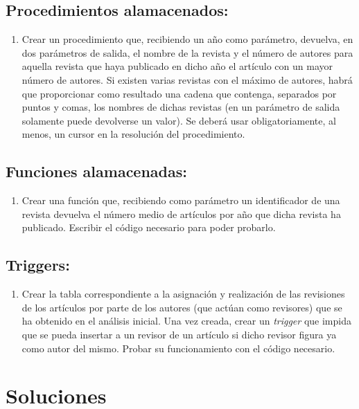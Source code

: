 \documentclass{db-practice}
\begin{document}
\subsection*{Procedimientos alamacenados:}

\begin{enumerate}
    \item Crear un procedimiento que, recibiendo un año como parámetro, devuelva, en dos parámetros de salida, el nombre de la revista y el número de autores para aquella revista que haya publicado en dicho año el artículo con un mayor número de autores. Si existen varias revistas con el máximo de autores, habrá que proporcionar como resultado una cadena que contenga, separados por puntos y comas, los nombres de dichas revistas (en un parámetro de salida solamente puede devolverse un valor). Se deberá usar obligatoriamente, al menos, un cursor en la resolución del procedimiento.
\end{enumerate}

\subsection*{Funciones alamacenadas:}

\begin{enumerate}
    \item Crear una función que, recibiendo como parámetro un identificador de una revista devuelva el número medio de artículos por año que dicha revista ha publicado. Escribir el código necesario para poder probarlo.
\end{enumerate}

\subsection*{Triggers:}

\begin{enumerate}
    \item Crear la tabla correspondiente a la asignación y realización de las revisiones de los artículos por parte de los autores (que actúan como revisores) que se ha obtenido en el análisis inicial. Una vez creada, crear un \textit{trigger} que impida que se pueda insertar a un revisor de un artículo si dicho revisor figura ya como autor del mismo. Probar su funcionamiento con el código necesario.
\end{enumerate}

\section{Soluciones}
\end{document}
